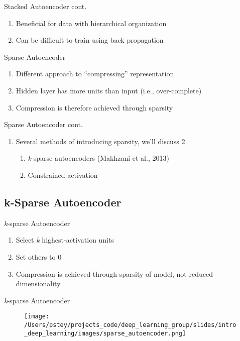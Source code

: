 \documentclass[pdf]{beamer}
\begin{document}
		\begin{frame} {Stacked Autoencoder cont.}
		\begin{enumerate}
			\item Beneficial for data with hierarchical organization
			\item Can be difficult to train using back propagation 
		\end{enumerate}
		\end{frame}


\begin{frame}{Sparse Autoencoder}
		\begin{enumerate}
			\item Different approach to ``compressing'' representation 
			\item Hidden layer has more units than input (i.e., over-complete)
			\item Compression is therefore achieved through sparsity
		\end{enumerate}
		\end{frame}
		
		
		\begin{frame}{Sparse Autoencoder cont.}
		\begin{enumerate}
			\item Several methods of introducing sparsity, we'll discuss 2
			\begin{enumerate}
				\item \textit{k}-sparse autoencoders (Makhzani et al., 2013)
				\item Constrained activation
			\end{enumerate}
		\end{enumerate}
		\end{frame}
		
\subsection{k-Sparse Autoencoder}
		\begin{frame}{\textit{k}-sparse Autoencoder}
		\begin{enumerate}
			\item Select \textit{k} highest-activation units
			\item Set others to $0$
			\item Compression is achieved through sparsity of model, not reduced dimensionality
		\end{enumerate}
		\end{frame}


		\begin{frame}{\textit{k}-sparse Autoencoder}
		\begin{figure}
			\texttt{[image: /Users/pstey/projects\_code/deep\_learning\_group/slides/intro\_deep\_learning/images/sparse\_autoencoder.png]}
		\end{figure}	
		\end{frame}
		
\end{document}
